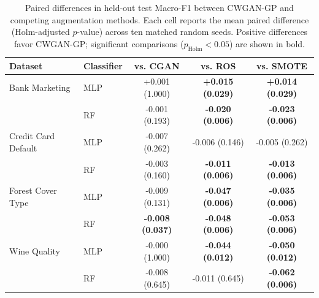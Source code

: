 \begin{table}[htbp]
\centering
\caption{Paired differences in held-out test Macro-F1 between CWGAN-GP and competing augmentation methods. Each cell reports the mean paired difference (Holm-adjusted $p$-value) across ten matched random seeds. Positive differences favor CWGAN-GP; significant comparisons ($p_{\mathrm{Holm}}<0.05$) are shown in bold.}
\label{tab:paired_comparisons}
\small
\begin{tabular}{llccc}
\toprule
Dataset & Classifier & vs. CGAN & vs. ROS & vs. SMOTE \\
\midrule
Bank Marketing & MLP & +0.001 (1.000) & \textbf{+0.015 (0.029)} & \textbf{+0.014 (0.029)} \\
 & RF & -0.001 (0.193) & \textbf{-0.020 (0.006)} & \textbf{-0.023 (0.006)} \\
\midrule
Credit Card Default & MLP & -0.007 (0.262) & -0.006 (0.146) & -0.005 (0.262) \\
 & RF & -0.003 (0.160) & \textbf{-0.011 (0.006)} & \textbf{-0.013 (0.006)} \\
\midrule
Forest Cover Type & MLP & -0.009 (0.131) & \textbf{-0.047 (0.006)} & \textbf{-0.035 (0.006)} \\
 & RF & \textbf{-0.008 (0.037)} & \textbf{-0.048 (0.006)} & \textbf{-0.053 (0.006)} \\
\midrule
Wine Quality & MLP & -0.000 (1.000) & \textbf{-0.044 (0.012)} & \textbf{-0.050 (0.012)} \\
 & RF & -0.008 (0.645) & -0.011 (0.645) & \textbf{-0.062 (0.006)} \\
\bottomrule
\end{tabular}
\end{table}